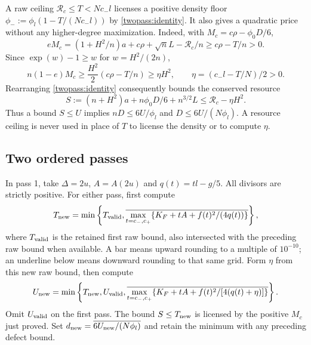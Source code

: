 A raw ceiling $\mathcal R_c\le T<Nc_-l$ licenses a positive density floor
$\phi_-:=\phi_l(1-T/(Nc_-l))$ by \eqref{twopass:identity}.
It also gives a quadratic price without any higher-degree maximization.
Indeed, with $M_c=c\rho-\phi_0D/6$,
\[
 eM_c=(1+H^2/n)a+c\rho+\sqrt nL-\mathcal R_c/n
       \ge c\rho-T/n>0.
\]
Since $\exp(w)-1\ge w$ for $w=H^2/(2n)$,
\[
 n(1-e)M_c\ge\frac{H^2}{2}(c\rho-T/n)
             \ge\eta H^2,\qquad \eta=(c_-l-T/N)/2>0.
\]
Rearranging \eqref{twopass:identity} consequently bounds the conserved
resource
\begin{equation}\label{twopass:resource}
 S:=(n+H^2)a+n\phi_0D/6+n^{3/2}L
 \le\mathcal R_c-\eta H^2.
\end{equation}
Thus a bound $S\le U$ implies $nD\le6U/\phi_l$ and
$D\le6U/(N\phi_l)$. A resource ceiling is never used in place of $T$
to license the density or to compute $\eta$.

\subsection{Two ordered passes}

In pass 1, take $\Delta=2u$, $A=A(2u)$ and $q(t)=tl-g/5$.
All divisors are strictly positive. For either pass, first compute
\begin{equation}\label{twopass:squares}
 T_{\rm new}=\min\left\{T_{\rm valid},
  \overline{\max_{t=c_-,c_+}\{K_F+tA+f(t)^2/(4q(t))\}}\right\},
\end{equation}
where $T_{\rm valid}$ is the retained first raw bound, also intersected
with the preceding raw bound when available. A bar means upward rounding
to a multiple of $10^{-10}$; an underline below means downward rounding
to that same grid.
Form $\eta$ from this new raw bound, then compute
\[
 U_{\rm new}=\min\left\{T_{\rm new},U_{\rm valid},
  \overline{\max_{t=c_-,c_+}
    \{K_F+tA+f(t)^2/[4(q(t)+\eta)]\}}\right\}.
\]
Omit $U_{\rm valid}$ on the first pass. The bound $S\le T_{\rm new}$
is licensed by the positive $M_c$ just proved. Set
$d_{\rm new}=\overline{6U_{\rm new}/(N\phi_l)}$ and retain the minimum
with any preceding defect bound.

